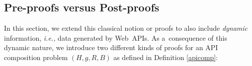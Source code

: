 

\subsection{Pre-proofs versus Post-proofs}
\label{sec:PrePostProof}
In this section, we extend this classical notion or proofs
to also include \emph{dynamic} information,
{\it i.e.,} data generated by Web~APIs.
As a~consequence of this dynamic nature,
we introduce two different kinds of proofs for an API composition problem $(H, g, R, B)$ as defined in Definition \ref{apicomp}:


